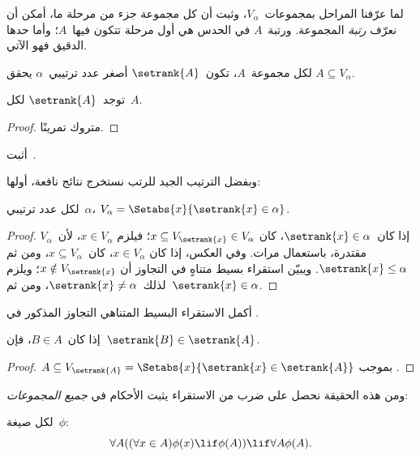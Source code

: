 \documentclass[../../../include/open-logic-section]{subfiles}
\begin{document}

لما عرّفنا المراحل بمجموعات~$V_\alpha$، وثبت أن كل مجموعة جزء من
مرحلة ما، أمكن أن نعرّف \emph{رتبة} المجموعة. ورتبة~$A$ في الحدس
هي أول مرحلة تتكون فيها~$A$؛ وأما حدها الدقيق فهو الآتي.

\begin{defn}
لكل مجموعة~$A$، تكون~$\setrank{A}$ أصغر عدد ترتيبي~$\alpha$ يحقق
$A \subseteq V_\alpha$.
\end{defn}
\begin{prop}
	توجد~$\setrank{A}$ لكل~$A$.
\end{prop}
\begin{proof}
	متروك تمرينًا.
\end{proof}
\begin{prob}
	أثبت~.
\end{prob}
\noindent
وبفضل الترتيب الجيد للرتب نستخرج نتائج نافعة، أولها:
\begin{prop}
لكل عدد ترتيبي~$\alpha$،
$V_\alpha = \Setabs{x}{\setrank{x} \in \alpha}$.
\end{prop}

\begin{proof}
إذا كان~$\setrank{x} \in \alpha$، كان
$x \subseteq V_{\setrank{x}} \in V_\alpha$؛ فيلزم
$x \in V_\alpha$، لأن~$V_\alpha$ مقتدرة، باستعمال
 مرات. وفي العكس، إذا كان
$x \in V_\alpha$، كان~$x \subseteq V_\alpha$، ومن ثم
$\setrank{x} \leq \alpha$. ويبيّن استقراء بسيط متناهٍ في التجاوز أن
$x \notin V_{\setrank{x}}$؛ ويلزم لذلك~$\setrank{x} \neq \alpha$،
ومن ثم~$\setrank{x} \in \alpha$.
\end{proof}
\begin{prob}
	أكمل الاستقراء البسيط المتناهي التجاوز المذكور في
	.
\end{prob}

\begin{prop}
إذا كان~$B \in A$، فإن~$\setrank{B} \in \setrank{A}$.
\end{prop}

\begin{proof}
$A \subseteq V_{\setrank{A}} =
\Setabs{x}{\setrank{x} \in \setrank{A}}$ بموجب
.
\end{proof}
\noindent
ومن هذه الحقيقة نحصل على ضرب من الاستقراء يثبت الأحكام في
\emph{جميع المجموعات}:

\begin{thm}
لكل صيغة~$\phi$:
\[
	\forall A((\forall x \in A)\phi(x) \lif \phi(A)) \lif \forall A \phi(A).
\]
\end{thm}
\end{document}
